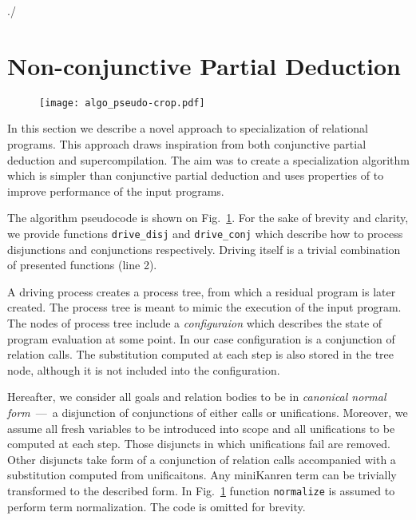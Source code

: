 ./\newcommand{\code}[1]{\texttt{#1}}

\section{Non-conjunctive Partial Deduction}

\begin{figure}[!t]
  \centering
  \texttt{[image: algo\_pseudo-crop.pdf]}
  \caption{}
  \label{fig:ncpd-pseudo}
\end{figure}

In this section we describe a novel approach to specialization of relational programs.
This approach draws inspiration from both conjunctive partial deduction and supercompilation.
The aim was to create a specialization algorithm which is simpler than conjunctive partial deduction and uses properties of \mk{} to improve performance of the input programs.

The algorithm pseudocode is shown on Fig.~\ref{fig:ncpd-pseudo}.
For the sake of brevity and clarity, we provide functions \code{drive\_disj} and \code{drive\_conj} which describe how to process disjunctions and conjunctions respectively.
Driving itself is a trivial combination of presented functions (line 2).

A driving process creates a process tree, from which a residual program is later created.
The process tree is meant to mimic the execution of the input program.
The nodes of process tree include a \emph{configuraion} which describes the state of program evaluation at some point.
In our case configuration is a conjunction of relation calls.
The substitution computed at each step is also stored in the tree node, although it is not included into the configuration.

Hereafter, we consider all goals and relation bodies to be in \emph{canonical normal form}~---~a disjunction of conjunctions of either calls or unifications.
Moreover, we assume all fresh variables to be introduced into scope and all unifications to be computed at each step.
Those disjuncts in which unifications fail are removed.
Other disjuncts take form of a conjunction of relation calls accompanied with a substitution computed from unificaitons.
Any miniKanren term can be trivially transformed to the described form.
In Fig.~\ref{fig:ncpd-pseudo} function \code{normalize} is assumed to perform term normalization.
The code is omitted for brevity.



